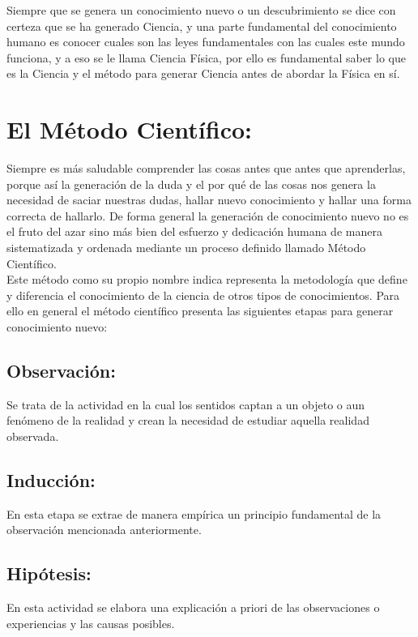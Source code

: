 \documentclass[a5paper,pagesize,10pt,bibtotoc,pointlessnumbers,
normalheadings,DIV=9,fleqn,x11names,table,twoside=false]{scrbook}
\begin{document}
Siempre que se genera un conocimiento nuevo o un descubrimiento se dice con certeza que se ha generado Ciencia, y una parte 
fundamental del conocimiento humano es conocer cuales son las leyes fundamentales con las cuales este mundo funciona, y  a eso se 
le llama Ciencia Física, por ello es 
fundamental saber lo que es la Ciencia y el método para generar Ciencia antes de abordar la Física en sí.

\section{El Método Científico:}

Siempre es más saludable comprender las cosas antes que antes que aprenderlas, porque así la generación de la duda y el por qué de 
las cosas nos genera la necesidad de saciar nuestras dudas, hallar nuevo conocimiento y hallar una forma correcta de hallarlo. De 
forma general la generación de 
conocimiento nuevo no es el fruto del azar sino más bien del esfuerzo y dedicación humana de manera sistematizada y ordenada 
mediante un proceso definido llamado Método Científico.\\

Este método como su propio nombre indica representa la metodología que define y diferencia el conocimiento de la ciencia de otros 
tipos de conocimientos. Para ello en general el método científico presenta las siguientes etapas para generar conocimiento nuevo:

\subsection{Observación:}
Se trata de la actividad en la cual los sentidos captan a un objeto o aun fenómeno de la realidad y crean la necesidad de estudiar 
aquella realidad observada.

\subsection{Inducción:}

En esta etapa se extrae de manera empírica un principio fundamental de la observación mencionada anteriormente.

\subsection{Hipótesis:}

En esta actividad se elabora una explicación a priori de las observaciones o experiencias y las causas posibles.
\end{document}
